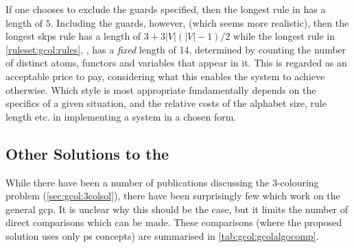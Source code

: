 If one chooses to exclude the guards specified, then the longest rule in \cite{Gheorghe2013} has a length of \(5\).  Including the guards, however, (which seems more realistic), then the longest \gls{skps} rule has a length of \(3 + 3|V|(|V| - 1)/2\) while the longest rule in \cref{ruleset:gcol:rules}, , has a \emph{fixed} length of 14, determined by counting the number of distinct atoms, \glspl{functor} and variables that appear in it.  This is regarded as an acceptable price to pay, considering what this enables the system to achieve otherwise.  Which style is most appropriate fundamentally depends on the specifics of a given situation, and the relative costs of the alphabet size, rule length etc. in implementing a system in a chosen form.


\subsection{\label{sec:gcol:gcpsol}Other Solutions to the }

While there have been a number of publications discussing the 3-colouring problem (\cref{sec:gcol:3colsol}), there have been surprisingly few which work on the general \gls{gcp}.  It is unclear why this should be the case, but it limits the number of direct comparisons which can be made.  These comparisons (where the proposed solution uses only \gls{ps} concepts) are summarised in \cref{tab:gcol:gcolalgocomp}.

